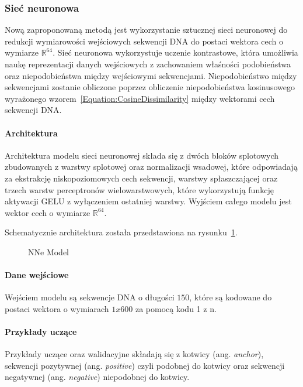         \subsubsection{Sieć neuronowa}

            Nową zaproponowaną metodą jest wykorzystanie sztucznej sieci neuronowej do redukcji wymiarowości wejściowych sekwencji DNA do postaci wektora cech o wymiarze $\mathbb{R}^{64}$. Sieć neuronowa wykorzystuje uczenie kontrastowe\cite{}, która umożliwia naukę reprezentacji danych wejściowych z zachowaniem właśności podobieństwa oraz niepodobieństwa między wejściowymi sekwencjami. Niepodobieństwo między sekwencjami zostanie obliczone poprzez obliczenie niepodobieństwa kosinusowego wyrażonego wzorem~\eqref{Equation:CosineDissimilarity} między wektorami cech sekwencji DNA.

            \paragraph{Architektura}
                Architektura modelu sieci neuronowej składa się z dwóch bloków splotowych zbudowanych z warstwy splotowej oraz normalizacji wsadowej, które odpowiadają za ekstrakcję niskopoziomowych cech sekwencji, warstwy spłaszczającej oraz trzech warstw perceptronów wielowarstwowych, które wykorzystują funkcję aktywacji GELU\cite{GELU} z wyłączeniem ostatniej warstwy. Wyjściem całego modelu jest wektor cech o wymiarze $\mathbb{R}^{64}$. 

                Schematycznie architektura została przedstawiona na rysunku~\ref{Picture:NeuralModel}. 

                \begin{figure}
                    \begin{center}
                        
                    \end{center}
                    \caption{
                        NNe Model
                    }\label{Picture:NeuralModel}
                \end{figure}

            \paragraph{Dane wejściowe}
                Wejściem modelu są sekwencje DNA o długości $150$, które są kodowane do postaci wektora o wymiarach $1x600$ za pomocą kodu 1 z n\cite{Kod1zN}.

            \paragraph{Przykłady uczące}
                Przykłady uczące oraz walidacyjne składają się z kotwicy (ang. \textit{anchor}), sekwencji pozytywnej (ang. \textit{positive}) czyli podobnej do kotwicy oraz sekwencji negatywnej (ang. \textit{negative}) niepodobnej do kotwicy.
            
